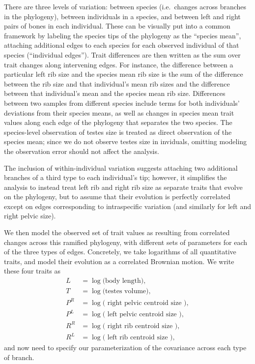 \documentclass[12pt]{article}
\begin{document}
There are three levels of variation:
between species (i.e.\ changes across branches in the phylogeny),
between individuals in a species,
and between left and right pairs of bones in each individual.
These can be visually put into a common framework by 
labeling the species tips of the phylogeny as the ``species mean'',
attaching additional edges to each species for each observed individual of that species (``individual edges'').
Trait differences are then written as the sum over trait changes along intervening edges.
For instance, the difference between a particular left rib size and the species mean rib size
is the sum of the difference between the rib size and that individual's mean rib sizes 
and the difference between that individual's mean and the species mean rib size.
Differences between two samples from different species include terms for both individuals' deviations from their species means,
as well as changes in species mean trait values along each edge of the phylogeny that separates the two species.
The species-level observation of testes size is treated as direct observation of the species mean;
since we do not observe testes size in inviduals, omitting modeling the observation error should not affect the analysis.

The inclusion of within-individual variation suggests attaching two additional branches of a third type
to each individual's tip;
however, it simplifies the analysis to instead treat left rib and right rib size 
as separate traits that evolve on the phylogeny,
but to assume that their evolution is perfectly correlated except on edges corresponding to intraspecific variation
(and similarly for left and right pelvic size).


We then model the observed set of trait values as resulting from correlated changes across this ramified phylogeny,
with different sets of parameters for each of the three types of edges.
Concretely, we take logarithms of all quantitative traits,
and model their evolution as a correlated Brownian motion.
We write these four traits as
\begin{align}
    L &= \log \text{(body length)}, \\
    T &= \log \text{(testes volume)}, \\
    P^R &= \log \text{( right pelvic centroid size )}, \\
    P^L &= \log \text{( left pelvic centroid size )}, \\
    R^R &= \log \text{( right rib centroid size )}, \\
    R^L &= \log \text{( left rib centroid size )},
\end{align}
and now need to specify our parameterization of the covariance across each type of branch.
\end{document}
